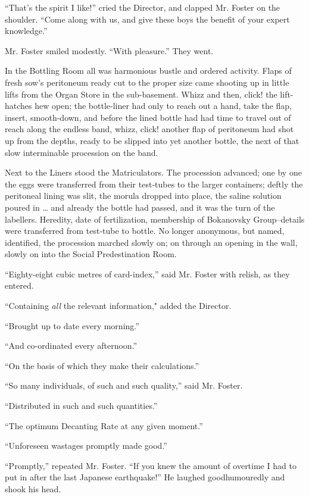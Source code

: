 \documentclass[12pt]{report}
\begin{document}
``That's the spirit I like!'' cried the Director, and clapped Mr. Foster
on the shoulder. ``Come along with us, and give these boys the benefit
of your expert knowledge.''

Mr. Foster smiled modestly. ``With pleasure.'' They went.

In the Bottling Room all was harmonious bustle and ordered activity.
Flaps of fresh sow's peritoneum ready cut to the proper size came
shooting up in little lifts from the Organ Store in the sub-basement.
Whizz and then, click! the lift-hatches hew open; the bottle-liner had
only to reach out a hand, take the flap, insert, smooth-down, and before
the lined bottle had had time to travel out of reach along the endless
band, whizz, click! another flap of peritoneum had shot up from the
depths, ready to be slipped into yet another bottle, the next of that
slow interminable procession on the band.

Next to the Liners stood the Matriculators. The procession advanced; one
by one the eggs were transferred from their test-tubes to the larger
containers; deftly the peritoneal lining was slit, the morula dropped
into place, the saline solution poured in \ldots{} and already the
bottle had passed, and it was the turn of the labellers. Heredity, date
of fertilization, membership of Bokanovsky Group--details were
transferred from test-tube to bottle. No longer anonymous, but named,
identified, the procession marched slowly on; on through an opening in
the wall, slowly on into the Social Predestination Room.

``Eighty-eight cubic metres of card-index,'' said Mr. Foster with
relish, as they entered.

``Containing \emph{all} the relevant information," added the Director.

``Brought up to date every morning.''

``And co-ordinated every afternoon.''

``On the basis of which they make their calculations.''

``So many individuals, of such and such quality,'' said Mr. Foster.

``Distributed in such and such quantities.''

``The optimum Decanting Rate at any given moment.''

``Unforeseen wastages promptly made good.''

``Promptly,'' repeated Mr. Foster. ``If you knew the amount of overtime
I had to put in after the last Japanese earthquake!'' He laughed
goodhumouredly and shook his head.
\end{document}
